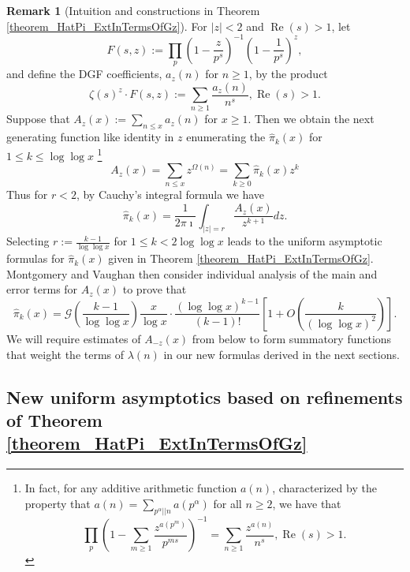 \documentclass[11pt,reqno,a4letter]{article}
\numberwithin{figure}{section}
\numberwithin{table}{section}
\newcommand{\cf}{\textit{cf.\ }}
\theoremstyle{plain}
\numberwithin{theorem}{section}
\theoremstyle{definition}
\newtheorem{remark}[theorem]{Remark}
\renewcommand{\Re}{\operatorname{Re}}
\begin{document}
\begin{remark}[Intuition and constructions in Theorem \ref{theorem_HatPi_ExtInTermsOfGz}] 
\label{remark_intuitionConstrIn_theorem_HatPi_ExtInTermsOfGz} 
For $|z| < 2$ and $\Re(s) > 1$, let 
\begin{equation} 
\label{eqn_IntuitionMVThm_FszFuncDef_v1} 
F(s, z) := \prod_{p} \left(1 - \frac{z}{p^s}\right)^{-1} \left(1 - \frac{1}{p^s}\right)^{z}, 
\end{equation} 
and define the DGF coefficients, $a_z(n)$ for $n \geq 1$, by the product 
\[
\zeta(s)^{z} \cdot F(s, z) := \sum_{n \geq 1} \frac{a_z(n)}{n^s}, \Re(s) > 1. 
\]
Suppose that $A_z(x) := \sum_{n \leq x} a_z(n)$ for $x \geq 1$. Then we obtain the next 
generating function like identity in $z$ enumerating the $\widehat{\pi}_k(x)$ for 
$1 \leq k \leq \log\log x$ \footnote{ 
     In fact, for any additive arithmetic function $a(n)$, 
     characterized by the property that 
     $a(n) = \sum_{p^{\alpha} || n} a(p^{\alpha})$ for all $n \geq 2$, we have that 
     \cite[\cf \S 1.7]{IWANIEC-KOWALSKI} 
     \[
     \prod_p \left( 
          1 - \sum_{m \geq 1} \frac{z^{a(p^m)}}{p^{ms}}\right)^{-1} = 
          \sum_{n \geq 1} \frac{z^{a(n)}}{n^s}, \Re(s) > 1. 
     \]
}
\begin{equation} 
\label{eqn_remark_MV_AzxCoeffFormlaIntegral_v1} 
A_z(x) = \sum_{n \leq x} z^{\Omega(n)} = \sum_{k \geq 0} \widehat{\pi}_k(x) z^k 
\end{equation} 
Thus for $r < 2$, by Cauchy's integral formula we have 
\[
\widehat{\pi}_k(x) = \frac{1}{2\pi\imath} \int_{|z|=r} \frac{A_z(x)}{z^{k+1}} dz. 
\]
Selecting $r := \frac{k-1}{\log\log x}$ for $1 \leq k < 2\log\log x$ 
leads to the uniform asymptotic formulas for $\widehat{\pi}_k(x)$ given in 
Theorem \ref{theorem_HatPi_ExtInTermsOfGz}. 
Montgomery and Vaughan then consider individual analysis of the main and error 
terms for $A_z(x)$ to prove that 
\[
\widehat{\pi}_k(x) = \mathcal{G}\left(\frac{k-1}{\log\log x}\right) \frac{x}{\log x} \cdot 
     \frac{(\log\log x)^{k-1}}{(k-1)!} \left[1 + O\left(\frac{k}{(\log\log x)^2}\right)\right]. 
\]
We will require estimates of $A_{-z}(x)$ from below to form summatory functions 
that weight the terms of $\lambda(n)$ in our new formulas derived in the next sections. 
\end{remark} 

\subsection{New uniform asymptotics based on refinements of Theorem \ref{theorem_HatPi_ExtInTermsOfGz}} 
\label{subSection_PartialPrimeProducts_Proofs} 
\end{document}
